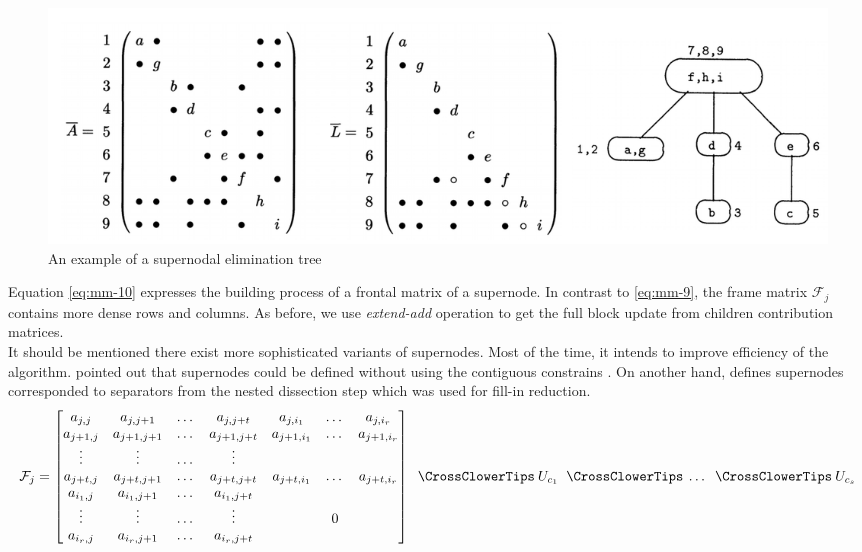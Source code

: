 \figpointer{\ref{fig:supernodal-method-postordering-and-etree}}

\begin{figure}[htpb]
  \centering
  \includegraphics[width=1.0\textwidth]{figures/chapter-2/supernodal-method-postordering-and-etree.png}
\caption{An example of a supernodal elimination tree \cite{mult-frontal-original:2}}
\label{fig:supernodal-method-postordering-and-etree}
\end{figure}
 
 
Equation \ref{eq:mm-10} expresses the building process of a frontal matrix of a supernode. In contrast to \ref{eq:mm-9}, the frame matrix $\mathcal{F}_{j}$ contains more dense rows and columns. As before, we use \textit{extend-add} operation to get the full block update from children contribution matrices.\\


It should be mentioned there exist more sophisticated variants of supernodes. Most of the time, it intends to improve efficiency of the algorithm. \citeauthor{mult-frontal-original:2} pointed out that supernodes could be defined without using the contiguous constrains \cite{mult-frontal-original:2}. On another hand, \citeauthor{complexity-of-spdm} defines supernodes corresponded to separators from the nested dissection step  \cite{complexity-of-spdm} which was used for fill-in reduction.\\



 \begin{equation} \label{eq:mm-10}
	\mathcal{F}_{j} = \begin{bmatrix}a_{j,j} & a_{j,j+1} & \dots & a_{j,j+t}  & a_{j,i_1} & \dots & a_{j,i_r} \\
a_{j+1,j} & a_{j+1,j+1} & \dots & a_{j+1,j+t}  & a_{j+1,i_1} & \dots & a_{j+1,i_r} \\
\vdots & \vdots & \dots & \vdots \\
a_{j+t,j}  & a_{j+t,j+1} & \dots & a_{j+t,j+t}  & a_{j+t,i_1} & \dots & a_{j+t,i_r} \\
a_{i_1,j} & a_{i_1,j+1} & \dots & a_{i_1,j+t} \\
\vdots & \vdots & \dots & \vdots  & & 0\\ 
a_{i_r,j} & a_{i_r,j+1} & \dots & a_{i_r,j+t} \\
\end{bmatrix} \extendadd U_{c_1} \extendadd \dots \extendadd U_{c_s} 
\end{equation}


